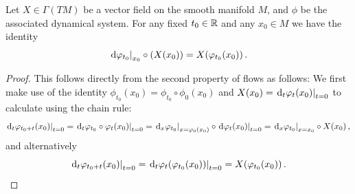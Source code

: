 \begin{remark}\label{rem: differential of a flow evaluated at the defining vector field}
	Let $X\in \Gamma(TM)$ be a vector field on the smooth manifold $M$, and $\phi$ be the associated dynamical system. For any fixed $t_0\in \mathbb{R}$ and any $x_0\in M$ we have the identity
	\begin{equation*}
		\left.\mathop{}\!\mathrm{d} \varphi_{t_0} \right|_{x_0} \circ\left(X(x_0)\right)=X(\varphi_{t_0}(x_0))\,.
	\end{equation*}
\end{remark}
\begin{proof}
	This follows directly from the second property of flows as follows:
	We first make use of the identity $\phi_{t_0}(x_0)=\phi_{t_0}\circ \phi_0(x_0)$ and $X(x_0)=\left.\mathop{}\!\mathrm{d}_t \varphi_t(x_0)\right|_{t=0}$ to calculate using the chain rule:
	\begin{equation*}
		\left.\mathop{}\!\mathrm{d}_t \varphi_{t_0+t}(x_0)\right|_{t=0}=	\left.\mathop{}\!\mathrm{d}_t \varphi_{t_0}\circ \varphi_t (x_0)\right|_{t=0}=\left.\mathop{}\!\mathrm{d}_x \varphi_{t_0}\right|_{x=\varphi_0(x_0)} \circ \left.\mathop{}\!\mathrm{d} \varphi_t(x_0)\right|_{t=0}=\left.\mathop{}\!\mathrm{d}_x \varphi_{t_0}\right|_{x=x_0}\circ X(x_0)\,,
	\end{equation*} and alternatively
	\begin{equation*}
		\left.\mathop{}\!\mathrm{d}_t \varphi_{t_0+t}(x_0)\right|_{t=0}=	\left.\mathop{}\!\mathrm{d}_t \varphi_{t}(\varphi_{t_0}(x_0))\right|_{t=0}=X(\varphi_{t_0}(x_0))\,.
	\end{equation*}
\end{proof}
